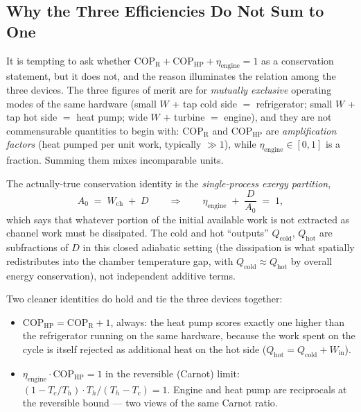 \subsection{Why the Three Efficiencies Do Not Sum to One}

It is tempting to ask whether $\mathrm{COP}_{\mathrm R}+\mathrm{COP}_{\mathrm{HP}}+
\eta_{\mathrm{engine}}=1$ as a conservation statement, but it does not, and the
reason illuminates the relation among the three devices. The three figures of
merit are for \emph{mutually exclusive} operating modes of the same hardware
(small $W$ + tap cold side $=$ refrigerator; small $W$ + tap hot side $=$ heat
pump; wide $W$ $+$ turbine $=$ engine), and they are not commensurable
quantities to begin with: $\mathrm{COP}_{\mathrm R}$ and $\mathrm{COP}_{\mathrm{HP}}$
are \emph{amplification factors} (heat pumped per unit work, typically $\gg 1$),
while $\eta_{\mathrm{engine}}\in[0,1]$ is a fraction. Summing them mixes
incomparable units.

The actually-true conservation identity is the \emph{single-process exergy
partition},
\begin{equation}\label{exergy-partition}
A_0 \;=\; W_{\mathrm{ch}}\;+\;D \qquad\Longrightarrow\qquad
\eta_{\mathrm{engine}}\;+\;\frac{D}{A_0}\;=\;1 ,
\end{equation}
which says that whatever portion of the initial available work is not extracted
as channel work must be dissipated. The cold and hot ``outputs''
$Q_{\mathrm{cold}}$, $Q_{\mathrm{hot}}$ are subfractions of $D$ in this closed
adiabatic setting (the dissipation is what spatially redistributes into the
chamber temperature gap, with $Q_{\mathrm{cold}}\approx Q_{\mathrm{hot}}$ by
overall energy conservation), not independent additive terms.

Two cleaner identities do hold and tie the three devices together:
\begin{itemize}
\item $\mathrm{COP}_{\mathrm{HP}}=\mathrm{COP}_{\mathrm R}+1$, always: the
heat pump scores exactly one higher than the refrigerator running on the same
hardware, because the work spent on the cycle is itself rejected as additional
heat on the hot side ($Q_{\mathrm{hot}}=Q_{\mathrm{cold}}+W_{\mathrm{in}}$).
\item $\eta_{\mathrm{engine}}\cdot\mathrm{COP}_{\mathrm{HP}}=1$ in the
reversible (Carnot) limit: $(1-T_c/T_h)\cdot T_h/(T_h-T_c)=1$. Engine and heat
pump are reciprocals at the reversible bound --- two views of the same Carnot
ratio.
\end{itemize}

